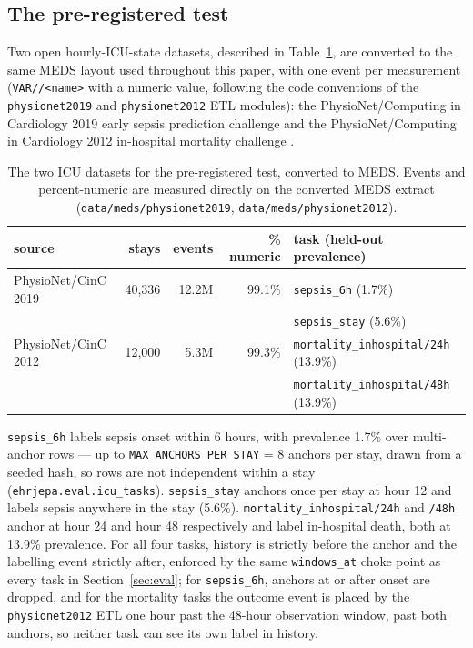 \documentclass[11pt,a4paper]{article}
\newcommand{\code}[1]{\texttt{\small #1}}
\begin{document}
\subsection{The pre-registered test}
\label{sec:a2plan}

Two open hourly-ICU-state datasets, described in
Table~\ref{tab:icudatasets}, are converted to the same MEDS layout used
throughout this paper, with one event per measurement
(\code{VAR//\textless name\textgreater} with a numeric value, following the
code conventions of the \code{physionet2019} and \code{physionet2012} ETL
modules): the PhysioNet/Computing in Cardiology 2019 early sepsis prediction
challenge \citep{reyna2019} and the PhysioNet/Computing in Cardiology 2012
in-hospital mortality challenge \citep{silva2012}.

\begin{table}[h]
\centering\small
\caption{The two ICU datasets for the pre-registered test, converted to MEDS.
Events and percent-numeric are measured directly on the converted MEDS
extract (\code{data/meds/physionet2019}, \code{data/meds/physionet2012}).}
\label{tab:icudatasets}
\begin{tabular}{lrrrl}
\toprule
source & stays & events & \% numeric & task (held-out prevalence) \\
\midrule
PhysioNet/CinC 2019 \citep{reyna2019} & 40{,}336 & 12.2M & 99.1\% &
  \code{sepsis\_6h} (1.7\%) \\
 & & & & \code{sepsis\_stay} (5.6\%) \\
PhysioNet/CinC 2012 \citep{silva2012} & 12{,}000 & 5.3M & 99.3\% &
  \code{mortality\_inhospital/24h} (13.9\%) \\
 & & & & \code{mortality\_inhospital/48h} (13.9\%) \\
\bottomrule
\end{tabular}
\end{table}

\code{sepsis\_6h} labels sepsis onset within 6 hours, with prevalence 1.7\%
over multi-anchor rows --- up to \code{MAX\_ANCHORS\_PER\_STAY} = 8 anchors
per stay, drawn from a seeded hash, so rows are not independent within a stay
(\code{ehrjepa.eval.icu\_tasks}). \code{sepsis\_stay} anchors once per stay
at hour 12 and labels sepsis anywhere in the stay (5.6\%).
\code{mortality\_inhospital/24h} and \code{/48h} anchor at hour 24 and hour
48 respectively and label in-hospital death, both at 13.9\% prevalence. For
all four tasks, history is strictly before the anchor and the labelling
event strictly after, enforced by the same \code{windows\_at} choke point as
every task in Section~\ref{sec:eval}; for \code{sepsis\_6h}, anchors at or
after onset are dropped, and for the mortality tasks the outcome event is
placed by the \code{physionet2012} ETL one hour past the 48-hour observation
window, past both anchors, so neither task can see its own label in history.
\end{document}
